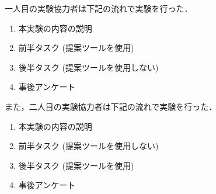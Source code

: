 一人目の実験協力者は下記の流れで実験を行った．
\begin{enumerate}
    \item 本実験の内容の説明
    \item 前半タスク (提案ツールを使用)
    \item 後半タスク (提案ツールを使用しない)
    \item 事後アンケート
\end{enumerate}

また，二人目の実験協力者は下記の流れで実験を行った．
\begin{enumerate}
    \item 本実験の内容の説明
    \item 前半タスク (提案ツールを使用しない)
    \item 後半タスク (提案ツールを使用)
    \item 事後アンケート
\end{enumerate}
